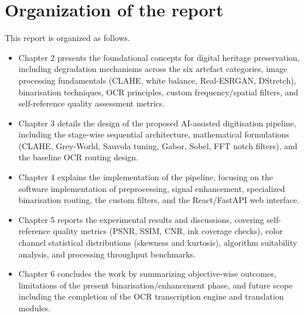 \section[Organization of the report]{Organization of the report}
This report is organized as follows.
\begin{itemize}
\item Chapter 2 presents the foundational concepts for digital heritage preservation, including degradation mechanisms across the six artefact categories, image processing fundamentals (CLAHE, white balance, Real-ESRGAN, DStretch), binarisation techniques, OCR principles, custom frequency/spatial filters, and self-reference quality assessment metrics.
\item Chapter 3 details the design of the proposed AI-assisted digitisation pipeline, including the stage-wise sequential architecture, mathematical formulations (CLAHE, Grey-World, Sauvola tuning, Gabor, Sobel, FFT notch filters), and the baseline OCR routing design.
\item Chapter 4 explains the implementation of the pipeline, focusing on the software implementation of preprocessing, signal enhancement, specialized binarisation routing, the custom filters, and the React/FastAPI web interface.
\item Chapter 5 reports the experimental results and discussions, covering self-reference quality metrics (PSNR, SSIM, CNR, ink coverage checks), color channel statistical distributions (skewness and kurtosis), algorithm suitability analysis, and processing throughput benchmarks.
\item Chapter 6 concludes the work by summarizing objective-wise outcomes, limitations of the present binarisation/enhancement phase, and future scope including the completion of the OCR transcription engine and translation modules.
\end{itemize}
